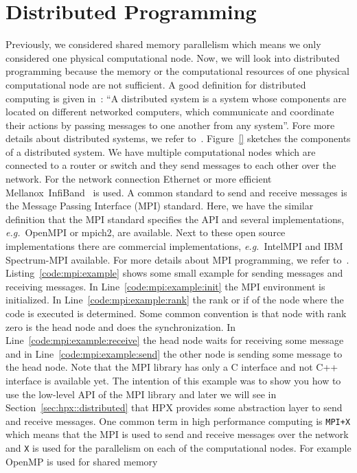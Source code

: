 \chapter{Distributed Programming}
\label{sec:distributed:programming}


Previously, we considered shared memory parallelism which means we only considered one physical computational node. Now, we will look into distributed programming because the memory or the computational resources of one physical computational node are not sufficient. A good definition for distributed computing is given in~\cite{van2002distributed}: ``A distributed system is a system whose components are located on different networked computers, which communicate and coordinate their actions by passing messages to one another from any system''. Fore more details about distributed systems, we refer to~\cite{van2002distributed}. Figure~\ref{} sketches the components of a distributed system. We have multiple computational nodes which are connected to a router or switch and they send messages to each other over the network. For the network connection Ethernet or more efficient Mellanox\textregistered~InfiBand\texttrademark~ is used. A common standard to send and receive messages is the Message Passing Interface (MPI) standard. Here, we have the similar definition that the MPI standard specifies the API and several implementations, \emph{e.g.}\ OpenMPI or mpich2, are available. Next to these open source implementations there are commercial implementations, \emph{e.g.}\ IntelMPI and IBM Spectrum-MPI available. For more details about MPI programming, we refer to~\cite{gropp1999using}. Listing~\ref{code:mpi:example} shows some small example for sending messages and receiving messages. In Line~\ref{code:mpi:example:init} the MPI environment is initialized. In Line~\ref{code:mpi:example:rank} the rank or if of the node where the code is executed is determined. Some common convention is that node with rank zero is the head node and does the synchronization. In Line~\ref{code:mpi:example:receive} the head node waits for receiving some message and in Line~\ref{code:mpi:example:send} the other node is sending some message to the head node. Note that the MPI library has only a C interface and not C++ interface is available yet. The intention of this example was to show you how to use the low-level API of the MPI library and later we will see in Section~\ref{sec:hpx::distributed} that HPX provides some abstraction layer to send and receive messages. One common term in high performance computing is \texttt{MPI+X} which means that the MPI is used to send and receive messages over the network and \texttt{X} is used for the parallelism on each of the computational nodes. For example OpenMP is used for shared memory 